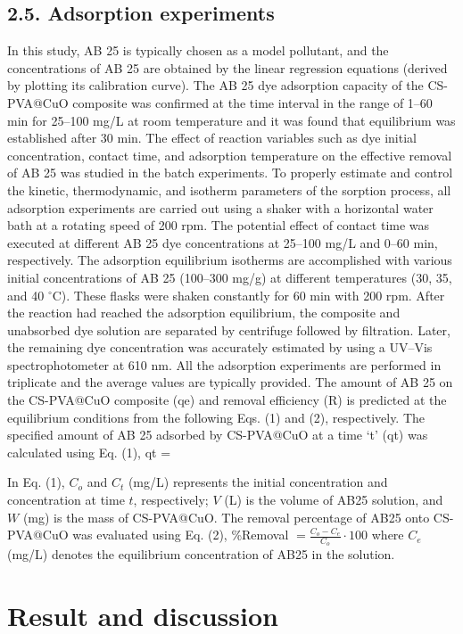 \documentclass[final,5p,times,twocolumn,authoryear]{elsarticle}
\begin{document}
\subsection{2.5. Adsorption experiments}
In this study, AB 25 is typically chosen as a model pollutant, and the concentrations of AB 25 are obtained by the linear regression equations (derived by plotting its calibration curve). The AB 25 dye adsorption capacity of the CS-PVA@CuO composite was confirmed at the time interval in the range of 1–60 min for 25–100 mg/L at room temperature and it was found that equilibrium was established after 30 min. The effect of reaction variables such as dye initial concentration, contact time, and adsorption temperature on the effective removal of AB 25 was studied in the batch experiments. To properly estimate and control the kinetic, thermodynamic, and isotherm parameters of the sorption process, all adsorption experiments are carried out using a shaker with a horizontal water bath at a rotating speed of 200 rpm. The potential effect of contact time was executed at different AB 25 dye concentrations at 25–100 mg/L and 0–60 min, respectively. The adsorption equilibrium isotherms are accomplished with various initial concentrations of AB 25 (100–300 mg/g) at different temperatures (30, 35, and 40 $^\circ$C). These flasks were shaken constantly for 60 min with 200 rpm. After the reaction had reached the adsorption equilibrium, the composite and unabsorbed dye solution are separated by centrifuge followed by filtration. Later, the remaining dye concentration was accurately estimated by using a UV–Vis spectrophotometer at 610 nm. All the adsorption experiments are performed in triplicate and the average values are typically provided.
The amount of AB 25 on the CS-PVA@CuO composite (qe) and removal efficiency (R) is predicted at the equilibrium conditions from the following Eqs. (1) and (2), respectively.
The specified amount of AB 25 adsorbed by CS-PVA@CuO at a time ‘t’ (qt) was calculated using Eq. (1),
qt = 

In Eq. (1), $C_o$ and $C_t$ (mg/L) represents the initial concentration and concentration at time $t$, respectively; $V$ (L) is the volume of AB25 solution, and $W$ (mg) is the mass of CS-PVA@CuO.
The removal percentage of AB25 onto CS-PVA@CuO was evaluated using Eq. (2),
\%Removal $= \frac{C_o-C_e}{C_o} \cdot 100$
where $C_e$ (mg/L) denotes the equilibrium concentration of AB25 in the solution.
\section{Result and discussion}
\end{document}

